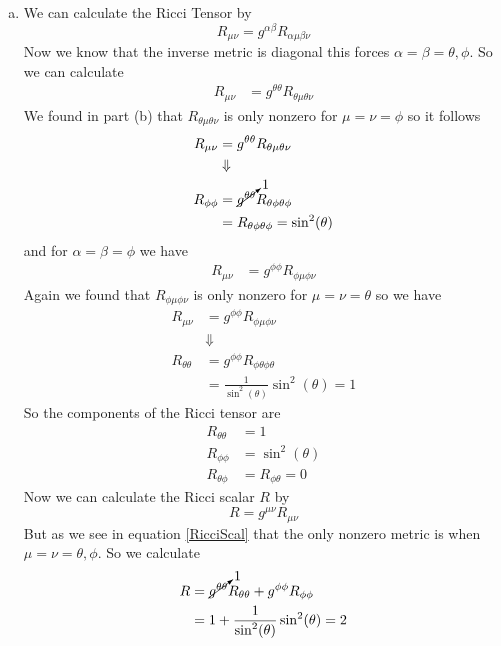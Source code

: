 \documentclass[11pt]{article}
\numberwithin{equation}{section}
\begin{document}
\begin{enumerate}[(a)]
\item
We can calculate the Ricci Tensor by
\begin{equation}
R_{\mu\nu} = g^{\alpha\beta}R_{\alpha\mu\beta\nu}
\label{RicciTen}
\end{equation}
Now we know that the inverse metric is diagonal this forces $\alpha = \beta = \theta, \phi$. So we can calculate
\begin{align*}
R_{\mu\nu} &= g^{\theta\theta}R_{\theta\mu\theta\nu}
\end{align*}
We found in part (b) that $R_{\theta\mu\theta\nu}$ is only nonzero for $\mu=\nu=\phi$ so it follows 
\begin{align*}
R_{\mu\nu} &= g^{\theta\theta}R_{\theta\mu\theta\nu}\\
&\Downarrow\\
R_{\phi\phi} &= \cancelto{1}{g^{\theta\theta}}R_{\theta\phi\theta\phi}\\
&= R_{\theta\phi\theta\phi} = \sin^2(\theta)
\end{align*}
and for $\alpha=\beta=\phi$ we have
\begin{align*}
R_{\mu\nu} &= g^{\phi\phi}R_{\phi\mu\phi\nu}
\end{align*}
Again we found that $R_{\phi\mu\phi\nu}$ is only nonzero for $\mu=\nu=\theta$ so we have
\begin{align*}
R_{\mu\nu} &= g^{\phi\phi}R_{\phi\mu\phi\nu}\\
&\Downarrow\\
R_{\theta\theta} &= g^{\phi\phi}R_{\phi\theta\phi\theta}\\
&= \frac{1}{\sin^2(\theta)}\sin^2(\theta) = 1
\end{align*}
So the components of the Ricci tensor are
\begin{align*}
R_{\theta\theta} &= 1\\
R_{\phi\phi} &= \sin^2(\theta)\\
R_{\theta\phi} &=R_{\phi\theta} = 0
\end{align*}
Now we can calculate the Ricci scalar $R$ by
\begin{equation}
R = g^{\mu\nu}R_{\mu\nu}
\label{RicciScal}
\end{equation}
But as we see in equation \ref{RicciScal} that the only nonzero metric is when $\mu = \nu = \theta, \phi$. So we calculate
\begin{align*}
R &= \cancelto{1}{g^{\theta\theta}}R_{\theta\theta} + g^{\phi\phi}R_{\phi\phi}\\
&= 1 + \frac{1}{\sin^2(\theta)}\sin^2(\theta) = 2
\end{align*}


\end{enumerate}
\end{document}
